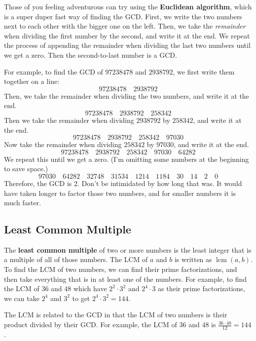 \documentclass{article}
\DeclareMathOperator{\lcm}{lcm}
\begin{document}
\begin{multicols}{2}
	Those of you feeling adventurous can try using the \textbf{Euclidean algorithm},
	which is a super duper fast way of finding the GCD.
	First, we write the two numbers next to each other with the bigger one on the left.
	Then, we take the \emph{remainder} when dividing the first number by the second,
	and write it at the end.
	We repeat the process of appending the remainder when dividing the last two numbers
	until we get a zero.
	Then the second-to-last number is a GCD.
	
	For example, to find the GCD of $97238478$ and $2938792$,
	we first write them together on a line:
	\[97238478 \quad 2938792\]
	Then, we take the remainder when dividing the two numbers, and write it at the end.
	\[97238478 \quad 2938792 \quad 258342\]
	Then we take the remainder when dividing $2938792$ by $258342$, and write it at the end.
	\[97238478 \quad 2938792 \quad 258342 \quad 97030\]
	Now take the remainder when dividing $258342$ by $97030$, and write it at the end.
	\[97238478 \quad 2938792 \quad 258342 \quad 97030 \quad 64282\]
	We repeat this until we get a zero.
	(I'm omitting some numbers at the beginning to save space.)
	\[97030 \quad 64282 \quad 32748 \quad 31534 \quad 1214 \quad 1184 \quad 30 \quad 14 \quad 2
	\quad 0\]
	Therefore, the GCD is $2$.
	Don't be intimidated by how long that was.
	It would have taken longer to factor those two numbers,
	and for smaller numbers it is much faster.
	
	\subsection*{Least Common Multiple}
	The \textbf{least common multiple} of two or more numbers is the least integer that
	is a multiple of all of those numbers.
	The LCM of $a$ and $b$ is written as $\lcm(a, b)$.
	To find the LCM of two numbers, we can find their prime factorizations, and then take everything
	that is in at least one of the numbers.
	For example, to find the LCM of $36$ and $48$ which have $2^2 \cdot 3^2$ and $2^4 \cdot 3$
	as their prime factorizations, we can take $2^4$ and $3^2$ to get $2^4 \cdot 3^2 = 144$.
	
	The LCM is related to the GCD in that the LCM of two numbers is their product divided by
	their GCD.
	For example, the LCM of $36$ and $48$ is $\frac{36 \cdot 48}{12} = 144$.
	

\end{multicols}
\end{document}
